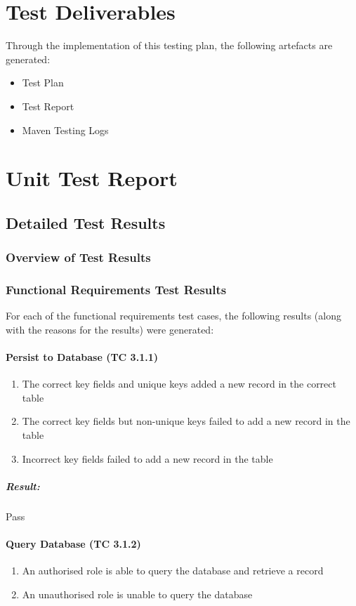 \documentclass{article}
\begin{document}
\section{Test Deliverables}
	Through the implementation of this testing plan, the following artefacts are generated:
	\begin{itemize}
		\item Test Plan
		\item Test Report
		\item Maven Testing Logs
	\end{itemize}
	
\section{Unit Test Report}
	\subsection{Detailed Test Results}
		\subsubsection{Overview of Test Results}
		\subsubsection{Functional Requirements Test Results}
			For each of the functional requirements test cases, the following results (along with the reasons for the results) were generated:
			
			\paragraph{Persist to Database (TC 3.1.1)}
				\begin{enumerate}
					\item The correct key fields and unique keys added a new record in the correct table
					\item The correct key fields but non-unique keys failed to add a new record in the table
					\item Incorrect key fields failed to add a new record in the table
				\end{enumerate}
				\subparagraph{Result: } Pass
			
			\paragraph{Query Database (TC 3.1.2)}
				\begin{enumerate}
					\item An authorised role is able to query the database and retrieve a record
					\item An unauthorised role is unable to query the database
				\end{enumerate}
			
\end{document}
